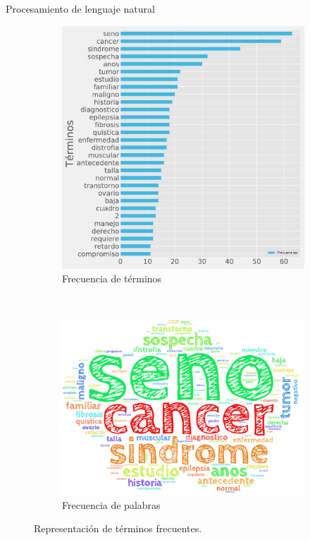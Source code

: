 \documentclass[xcolor=dvipsnames]{beamer}
\begin{document}
\begin{frame}{Procesamiento de lenguaje natural}
	
   \begin{figure}
		\centering
		\begin{subfigure}[b]{0.4\textwidth}
			\includegraphics[width=\textwidth]{frecuecias.pdf}
			\caption{Frecuencia de términos}
		\end{subfigure}
		~ %
		\begin{subfigure}[b]{0.47\textwidth}
			\includegraphics[width=\textwidth]{sin_stop.png}
			\caption{Frecuencia de palabras}
		\end{subfigure}
		\caption{Representación de términos frecuentes.}
	\end{figure}
\end{frame}
\end{document}
